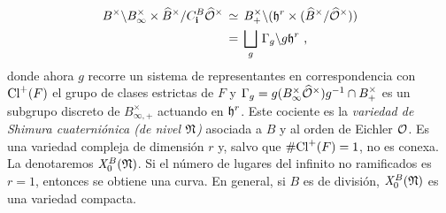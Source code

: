 \begin{align*}
	B^{\times}\backslash
		\Idinf{B}\times\Idfin{B}/C^{B}_{\mathbf{i}}\Idfin{\cal{O}}
		& \,\simeq\,B_{+}^{\times}\backslash
		(\hP^{r}\times (\Idfin{B}/\Idfin{\cal{O}})) \\
	& \,=\,\bigsqcup_{g}\,\Gamma_{g}\backslash g\hP^{r}
	\text{ ,}
\end{align*}
%
donde ahora $g$ recorre un sistema de representantes en correspondencia
con $\pClass{F}$ el grupo de clases estrictas de $F$ y
\begin{math}
	\Gamma_{g}=g(\Idinf{B}\Idfin{\cal{O}})g^{-1}\cap B_{+}^{\times}
\end{math}
es un subgrupo discreto de $B_{\infty,+}^{\times}$ actuando en $\hP^{r}$.
Este cociente es la \emph{variedad de Shimura cuaterni\'{o}nica %
(de nivel $\frak{N}$)}
asociada a $B$ y al orden de Eichler $\cal{O}$. Es una variedad compleja
de dimensi\'{o}n $r$ y, salvo que $\#\pClass{F}=1$, no es conexa.
La denotaremos $\shimura[B]{\frak{N}}$. Si el n\'{u}mero de lugares del
infinito no ramificados es $r=1$, entonces se obtiene una curva. En general, si
$B$ es de divisi\'{o}n, $\shimura[B]{\frak{N}}$ es una variedad compacta.

